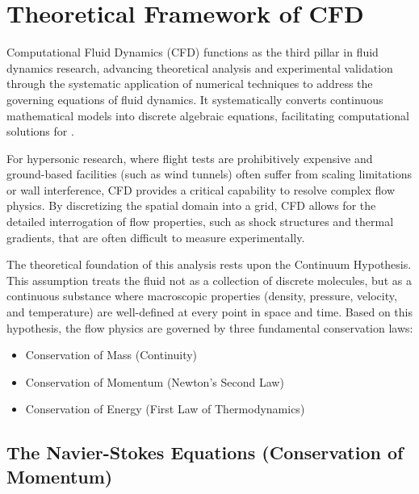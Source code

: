 \section{Theoretical Framework of CFD}
\label{sec:cfd_framework}
Computational Fluid Dynamics (CFD) functions as the third pillar in fluid dynamics research, advancing theoretical analysis and experimental validation through the systematic application of numerical techniques to address the governing equations of fluid dynamics. It systematically converts continuous mathematical models into discrete algebraic equations, facilitating computational solutions for \cite{versteeg2007cfd}.
\par
For hypersonic research, where flight tests are prohibitively expensive and ground-based facilities (such as wind tunnels) often suffer from scaling limitations or wall interference, CFD provides a critical capability to resolve complex flow physics. By discretizing the spatial domain into a grid, CFD allows for the detailed interrogation of flow properties, such as shock structures and thermal gradients, that are often difficult to measure experimentally.
\par
The theoretical foundation of this analysis rests upon the Continuum Hypothesis. This assumption treats the fluid not as a collection of discrete molecules, but as a continuous substance where macroscopic properties (density, pressure, velocity, and temperature) are well-defined at every point in space and time. Based on this hypothesis, the flow physics are governed by three fundamental conservation laws:
\begin{itemize}
    \item Conservation of Mass (Continuity)

    \item Conservation of Momentum (Newton's Second Law)

    \item Conservation of Energy (First Law of Thermodynamics)
\end{itemize}

\subsection{The Navier-Stokes Equations (Conservation of Momentum)}

